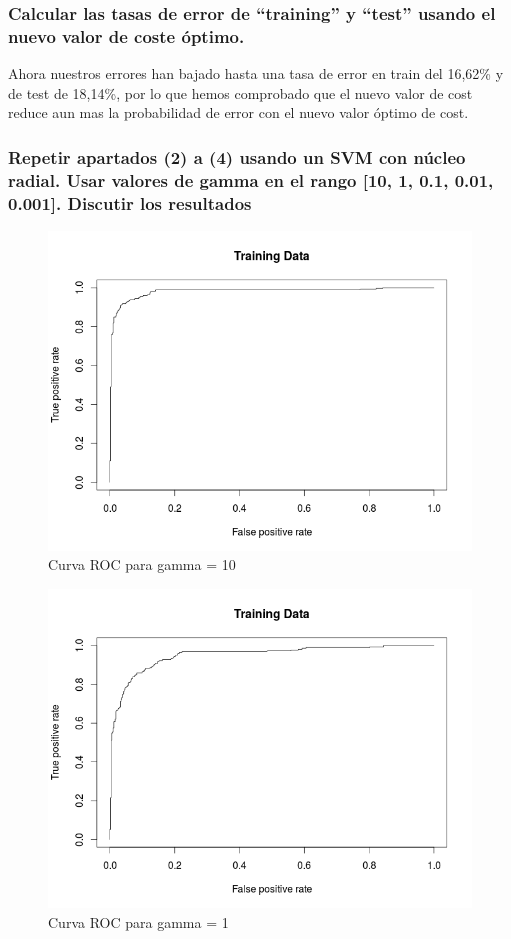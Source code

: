 \subsubsection{Calcular las tasas de error de “training” y “test” usando el nuevo valor de coste óptimo.}

Ahora nuestros errores han bajado hasta una tasa de error en train del 16,62\% y de test de 18,14\%, por lo que hemos comprobado que el nuevo valor de cost reduce aun mas la probabilidad de error con el nuevo valor óptimo de cost.

\subsubsection{Repetir apartados (2) a (4) usando un SVM con núcleo radial. Usar valores de gamma en el rango [10, 1, 0.1, 0.01, 0.001]. Discutir los resultados}

\begin{figure}[H]
\centering
\includegraphics[scale=0.50]{ej1-5.png}
\caption{Curva ROC para gamma = 10}
\label{}
\end{figure}

\begin{figure}[H]
\centering
\includegraphics[scale=0.50]{ej1-52.png}
\caption{Curva ROC para gamma = 1}
\label{}
\end{figure}


